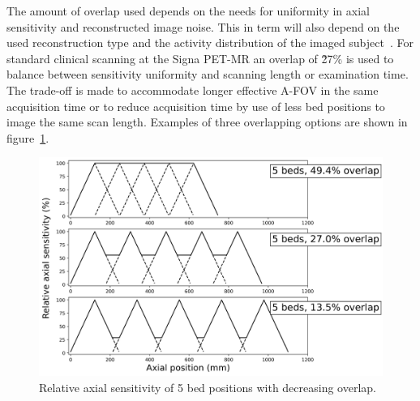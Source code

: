 The amount of overlap used depends on the needs for uniformity in axial sensitivity and reconstructed image noise. This in term will also depend on the used reconstruction type and the activity distribution of the imaged subject~\cite{Schubert1996}. 
For standard clinical scanning at the Signa PET-MR an overlap of \~27\% is used to balance between sensitivity uniformity and scanning length or examination time. The trade-off is made to accommodate longer effective A-FOV in the same acquisition time or to reduce acquisition time by use of less bed positions to image the same scan length. Examples of three overlapping options are shown in figure~\ref{fig3_1:decreasingOverlap}.
%
\begin{figure} [ht!]
\centering
\includegraphics[scale=0.5,angle=0]{3_Results/3_1_DWB_Optimization/figures/SensitivityProfiles_3Options.png}
\caption{Relative axial sensitivity of 5 bed positions with decreasing overlap.} 
\label{fig3_1:decreasingOverlap}
\end{figure}
%
%

